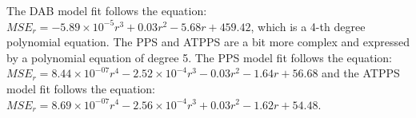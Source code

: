 The DAB model fit follows the equation: $MSE_r=-5.89\times10^{-5}r^{3}+0.03r^{2}-5.68r+459.42$, which is a 4-th degree polynomial equation. The PPS and ATPPS are a bit more complex and expressed by a polynomial equation of degree 5. The PPS model fit follows the equation: $MSE_r=8.44\times 10^{-07}r^{4}-2.52\times 10^{-4}r^{3}-0.03r^{2}-1.64r+56.68$ and the ATPPS model fit follows the equation: $MSE_r=8.69 \times 10^{-07}r^{4}-2.56 \times 10^{-4}r^{3}+0.03r^{2}-1.62r+54.48$.

%
%
%
%
